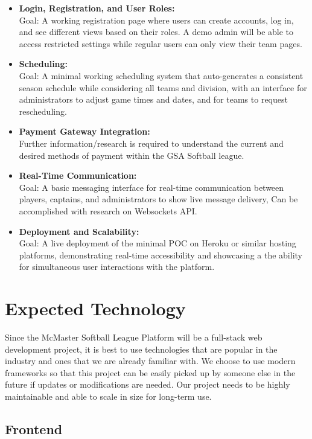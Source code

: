 \documentclass{article}
\begin{document}
\begin{itemize}
	\item \textbf{Login, Registration, and User Roles:} \\ Goal: A working registration page where users can create accounts, log in, and see different views based on their roles. A demo admin will be able to access restricted settings while regular users can only view their team pages. 
	\item \textbf{Scheduling:} \\ Goal: A minimal working scheduling system that auto-generates a consistent season schedule while considering all teams and division, with an interface for administrators to adjust game times and dates, and for teams to request rescheduling. 
  \item \textbf{Payment Gateway Integration:} \\ Further information/research is required to understand the current and desired methods of payment within the GSA Softball league. 
  \item \textbf{Real-Time Communication:} \\ Goal: A basic messaging interface for real-time communication between players, captains, and administrators to show live message delivery, Can be accomplished with research on Websockets API.
  \item \textbf{Deployment and Scalability:} \\ Goal: A live deployment of the minimal POC on Heroku or similar hosting platforms, demonstrating real-time accessibility and showcasing a the ability for simultaneous user interactions with the platform.
\end{itemize}

\section{Expected Technology}

Since the McMaster Softball League Platform will be a full-stack web development project, it is best to use technologies that are popular in the industry and ones that we are already familiar with. We choose to use modern frameworks so that this project can be easily picked up by someone else in the future if updates or modifications are needed. Our project needs to be highly maintainable and able to scale in size for long-term use.

\subsection*{Frontend}
\end{document}
